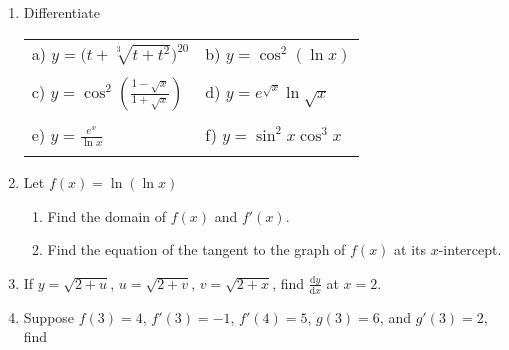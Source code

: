 \documentclass{article}
\newcommand{\ud}{\mathrm d}
\begin{document}
\begin{enumerate}
\item Differentiate

\begin{tabular}{ll}
a) $y=\big(t+\sqrt[3]{t+t^2}\big)^{20}$ \hspace{3cm} &
b) $y=\cos^2(\ln x)$ \\
\vspace{3cm} & \\
c) $y=\cos^2\left(\frac{1-\sqrt x}{1+\sqrt x}\right)$ &
d) $y=e^{\sqrt x}\ln \sqrt x$ \\
\vspace{3cm} & \\
e) $y=\frac{e^x}{\ln x}$ & f) $y=\sin^2x\cos^3x$ \\
\vspace{3cm} & \\
\end{tabular}
\item Let $f(x)=\ln(\ln x)$
\begin{enumerate}
\item Find the domain of $f(x)$ and $f'(x)$.
\item Find the equation of the tangent to the graph
of $f(x)$ at its $x$-intercept.
\end{enumerate}
\vspace{9cm}
\item If $y=\sqrt{2+u}$, $u=\sqrt{2+v}$, $v=\sqrt{2+x}$,
find $\frac{\ud y}{\ud x}$ at $x=2$.
\vspace{9cm}
\item Suppose $f(3)=4$, $f'(3)=-1$, $f'(4)=5$, $g(3)=6$,
and $g'(3)=2$, find


\end{enumerate}
\end{document}
